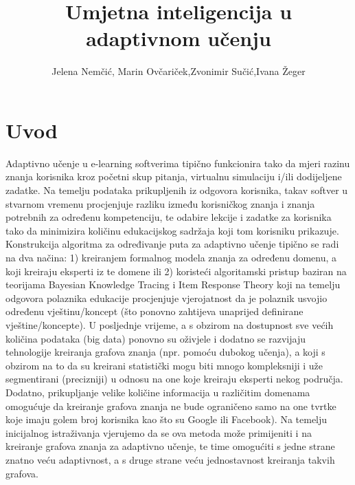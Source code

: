 \documentclass[times, utf8,projekt]{fer}
\begin{document}

\title{Umjetna inteligencija u adaptivnom učenju}

\author{Jelena Nemčić, Marin Ovčariček,Zvonimir Sučić,Ivana Žeger}

\maketitle
\chapter{Uvod}
Adaptivno učenje u e-learning softverima tipično funkcionira tako da mjeri razinu znanja korisnika kroz početni skup pitanja, virtualnu simulaciju i/ili dodijeljene zadatke. Na temelju podataka prikupljenih iz odgovora korisnika, takav softver u stvarnom vremenu procjenjuje razliku između korisničkog znanja i znanja potrebnih za određenu kompetenciju, te odabire lekcije i zadatke za korisnika tako da minimizira količinu edukacijskog sadržaja koji tom korisniku prikazuje.\newline
Konstrukcija algoritma za određivanje puta za adaptivno učenje tipično se radi na dva načina: 1) kreiranjem formalnog modela znanja za određenu domenu, a koji kreiraju eksperti iz te domene ili 2) koristeći algoritamski pristup baziran na teorijama Bayesian Knowledge Tracing i Item Response Theory koji na temelju odgovora polaznika edukacije procjenjuje vjerojatnost da je polaznik usvojio određenu vještinu/koncept (što ponovno zahtijeva unaprijed definirane vještine/koncepte).\newline
U posljednje vrijeme, a s obzirom na dostupnost sve većih količina podataka (big data) ponovno su oživjele i dodatno se razvijaju tehnologije kreiranja grafova znanja (npr. pomoću dubokog učenja), a koji s obzirom na to da su kreirani statistički mogu biti mnogo kompleksniji i uže segmentirani (precizniji) u odnosu na one koje kreiraju eksperti nekog područja. Dodatno, prikupljanje velike količine informacija u različitim domenama omogućuje da kreiranje grafova znanja ne bude ograničeno samo na one tvrtke koje imaju golem broj korisnika kao što su Google ili Facebook). Na temelju inicijalnog istraživanja vjerujemo da se ova metoda može primijeniti i na kreiranje grafova znanja za adaptivno učenje, te time omogućiti s jedne strane znatno veću adaptivnost, a s druge strane veću jednostavnost kreiranja takvih grafova.\newline
\end{document}
